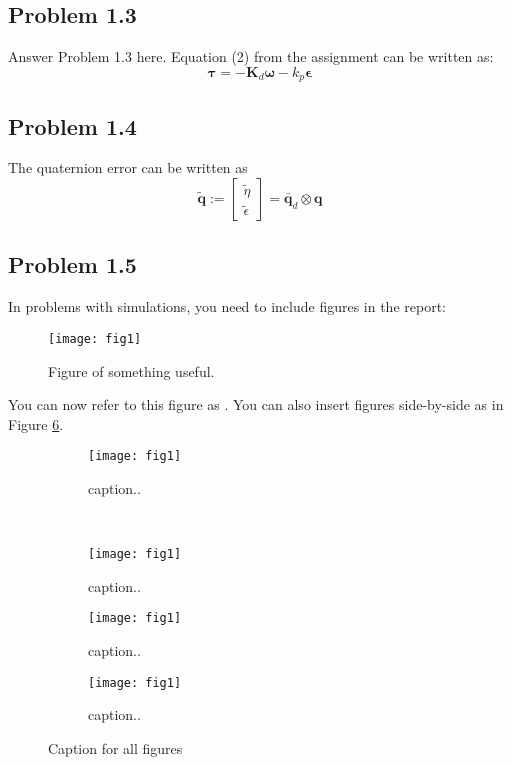 \subsection*{Problem 1.3}
Answer Problem 1.3 here. Equation (2) from the assignment can be written as: 
\begin{equation}
  \label{eq:tau}
  \mathbf{\tau} = -\mathbf{K}_d \boldsymbol{\omega} - k_p \boldsymbol{\epsilon}
\end{equation}

\subsection*{Problem 1.4}
The quaternion error can be written as
 \begin{equation}
	 \tilde{\mathbf{q}} := \left[
	 \begin{array}{c}
		 \tilde{\eta} \\
		 \tilde{\epsilon}
	 \end{array}
	 \right] = \bar{\mathbf{q}}_d \otimes \mathbf{q} 
 \end{equation}

\subsection*{Problem 1.5}
In problems with simulations, you need to include figures in the report:
\begin{figure}[ht]
	\centering
	\texttt{[image: fig1]} %
	\caption{Figure of something useful.}
	\label{fig:fig1}
\end{figure}

You can now refer to this figure as . You can also insert figures side-by-side as in Figure \ref{fig:2}. %
\begin{figure}[ht]
	\centering
	\begin{subfigure}[b]{0.45\textwidth}
		\texttt{[image: fig1]}
		\caption{caption..}
		\label{fig:2a}
	\end{subfigure}
	~ %
	\begin{subfigure}[b]{0.45\textwidth}
		\texttt{[image: fig1]}
		\caption{caption..}
		\label{fig:2b}
	\end{subfigure}
	\begin{subfigure}[b]{0.45\textwidth}
		\texttt{[image: fig1]}
		\caption{caption..}
		\label{fig:2c}
	\end{subfigure}
	\begin{subfigure}[b]{0.45\textwidth}
		\texttt{[image: fig1]}
		\caption{caption..}
		\label{fig:2d}
	\end{subfigure}		
	\caption{Caption for all figures}\label{fig:2}
\end{figure}


